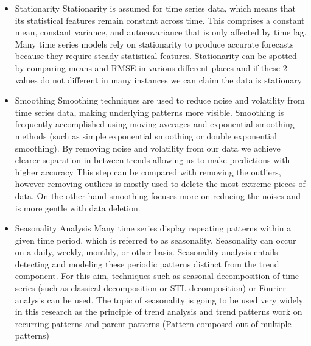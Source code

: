 \documentclass{imc-inf}
\begin{document}
	\begin{itemize}
		\item Stationarity
		Stationarity \cite{Smoothing_and_stationarity} is assumed for time series data, which means that its statistical features remain constant across time.
		This comprises a constant mean, constant variance, and autocovariance that is only affected by time lag.
		Many time series models rely on stationarity to produce accurate forecasts because they require steady statistical features.
		Stationarity can be spotted by comparing means and RMSE in various different places and if these 2 values do not different in many
		instances we can claim the data is stationary
		\item Smoothing
		Smoothing techniques are used to reduce noise and volatility from time series data, making underlying patterns more visible. 
		Smoothing is frequently accomplished using moving averages and exponential smoothing methods
		(such as simple exponential smoothing or double exponential smoothing). By removing noise and volatility from our data we achieve
		clearer separation in between trends allowing us to make predictions with higher accuracy This step can be compared with removing the outliers,
		however removing outliers is mostly used to delete the most extreme pieces of data. On the other hand smoothing focuses more on reducing the noises
		and is more gentle with data deletion.
		\item Seasonality Analysis
		Many time series display repeating patterns within a given time period, which is referred to as seasonality. Seasonality can occur on a daily, weekly, monthly, or other basis.
		Seasonality analysis entails detecting and modeling these periodic patterns distinct from the trend component.
		For this aim, techniques such as seasonal decomposition of time series (such as classical decomposition or STL decomposition) or Fourier analysis can be used.
		The topic of seasonality is going to be used very widely in this research as the principle of trend analysis and trend patterns work on recurring patterns and parent patterns
		(Pattern composed out of multiple patterns)

	\end{itemize}
\end{document}
